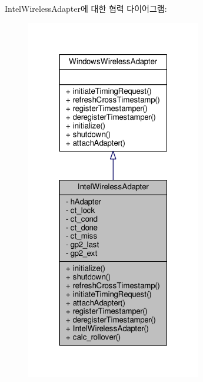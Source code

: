 Intel\+Wireless\+Adapter에 대한 협력 다이어그램\+:
\nopagebreak
\begin{figure}[H]
\begin{center}
\leavevmode
\includegraphics[width=217pt]{class_intel_wireless_adapter__coll__graph}
\end{center}
\end{figure}
